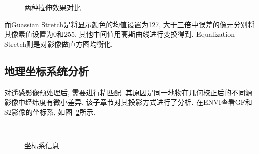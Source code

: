 \begin{figure}[!htbp]
    \centering
    \qquad
    \caption{两种拉伸效果对比}
    \label{fig:0214}
\end{figure}

而Guassian Stretch是将显示颜色的均值设置为127, 大于三倍中误差的像元分别将其像素值设置为0和255, 其他中间值用高斯曲线进行变换得到. Equalization Stretch则是对影像做直方图均衡化. 

\subsection{地理坐标系统分析}
对遥感影像预处理后, 需要进行精匹配. 其原因是同一地物在几何校正后的不同源影像中经纬度有微小差异, 该子章节对其投影方式进行了分析. 在ENVI查看GF和S2影像的坐标系, 如图~\ref{fig:0215}所示.

\begin{figure}[!htbp]
    \centering
    \\[12pt]
    \caption{坐标系信息}
    \label{fig:0215}
\end{figure}


